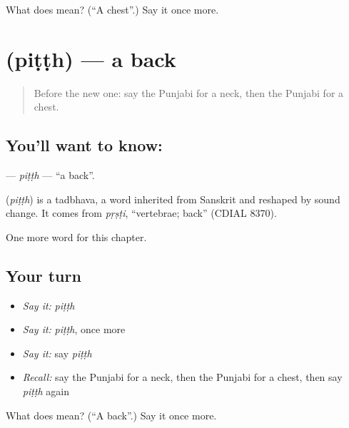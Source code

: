 \begin{tcolorbox}[breakable,colback=teal!4,colframe=teal!35!black,title={Before you move on}]
What does  mean? (\textquotedblleft{}A chest\textquotedblright{}.) Say it once more.
\end{tcolorbox}
\section[\texorpdfstring{\pa{ਪਿੱਠ} (piṭṭh)}{ਪਿੱਠ (piṭṭh)}]{ (piṭṭh) — a back}

\label{lesson:PA-C135-pitth}



\begin{quote}
Before the new one: say the Punjabi for a neck, then the Punjabi for a chest.
\end{quote}

\subsection*{You'll want to know: }
\textbf{} — \emph{piṭṭh} — \textquotedblleft{}a back\textquotedblright{}.

\begin{cousinweb}
\textbf{} (\emph{piṭṭh}) is a tadbhava, a word inherited from Sanskrit and reshaped by sound change. It comes from \emph{pṛṣṭi}, \textquotedblleft{}vertebrae; back\textquotedblright{} (CDIAL 8370).
\end{cousinweb}

\begin{grammarlens}[title={What you've built}]
One more word for this chapter.
\end{grammarlens}

\subsection*{Your turn}
\begin{itemize}
\raggedright
  \item \emph{Say it:} \emph{piṭṭh}
  \item \emph{Say it:} \emph{piṭṭh}, once more
  \item \emph{Say it:} say \emph{piṭṭh}
  \item \emph{Recall:} say the Punjabi for a neck, then the Punjabi for a chest, then say \emph{piṭṭh} again
\end{itemize}

\begin{tcolorbox}[breakable,colback=teal!4,colframe=teal!35!black,title={Before you move on}]
What does  mean? (\textquotedblleft{}A back\textquotedblright{}.) Say it once more.
\end{tcolorbox}
